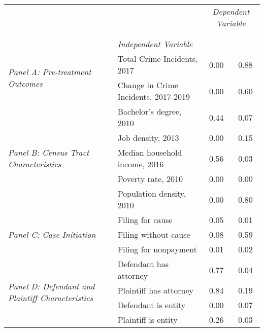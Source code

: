 \begin{tabular}{llcc}
\toprule
 &  & \multicolumn{2}{c}{\textit{Dependent Variable}} \\
\cline{3-4}
\\
 &  &  &  \\
 & \emph{Independent Variable} &  &  \\
\midrule
\multirow[c]{2}{3cm}{\textit{Panel A: Pre-treatment Outcomes}} & Total Crime Incidents, 2017 & 0.00 & 0.88 \\
 & Change in Crime Incidents, 2017-2019 & 0.00 & 0.60 \\
\cline{1-4}
\multirow[c]{5}{3cm}{\textit{Panel B: Census Tract Characteristics}} & Bachelor's degree, 2010 & 0.44 & 0.07 \\
 & Job density, 2013 & 0.00 & 0.15 \\
 & Median household income, 2016 & 0.56 & 0.03 \\
 & Poverty rate, 2010 & 0.00 & 0.00 \\
 & Population density, 2010 & 0.00 & 0.80 \\
\cline{1-4}
\multirow[c]{3}{3cm}{\textit{Panel C: Case Initiation}} & Filing for cause & 0.05 & 0.01 \\
 & Filing without cause & 0.08 & 0.59 \\
 & Filing for nonpayment & 0.01 & 0.02 \\
\cline{1-4}
\multirow[c]{4}{3cm}{\textit{Panel D: Defendant and Plaintiff Characteristics}} & Defendant has attorney & 0.77 & 0.04 \\
 & Plaintiff has attorney & 0.84 & 0.19 \\
 & Defendant is entity & 0.00 & 0.07 \\
 & Plaintiff is entity & 0.26 & 0.03 \\
\cline{1-4}
\bottomrule
\end{tabular}
